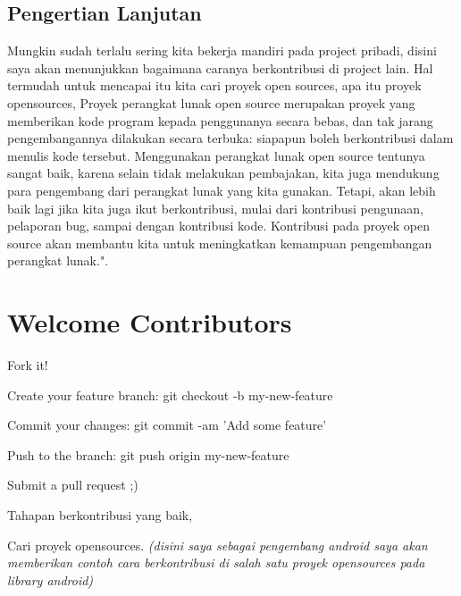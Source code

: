\subsection{Pengertian Lanjutan}

Mungkin sudah terlalu sering kita bekerja mandiri pada project pribadi, disini saya akan menunjukkan bagaimana caranya berkontribusi di project lain. Hal termudah untuk mencapai itu kita cari proyek open sources, apa itu proyek opensources, Proyek perangkat lunak open source merupakan proyek yang memberikan kode program kepada penggunanya secara bebas, dan tak jarang pengembangannya dilakukan secara terbuka: siapapun boleh berkontribusi dalam menulis kode tersebut. Menggunakan perangkat lunak open source tentunya sangat baik, karena selain tidak melakukan pembajakan, kita juga mendukung para pengembang dari perangkat lunak yang kita gunakan. Tetapi, akan lebih baik lagi jika kita juga ikut berkontribusi, mulai dari kontribusi pengunaan, pelaporan bug, sampai dengan kontribusi kode. Kontribusi pada proyek open source akan membantu kita untuk meningkatkan kemampuan pengembangan perangkat lunak.". \par
\vspace{12pt}
\vspace{12pt}
\noindent 
\section{Welcome Contributors} \par
Fork it! \par
Create your feature branch: git checkout -b my-new-feature \par
Commit your changes: git commit -am 'Add some feature' \par
Push to the branch: git push origin my-new-feature \par
Submit a pull request ;) \par
\noindent 
Tahapan berkontribusi yang baik, \par
\noindent 
Cari proyek opensources. \textit{(disini saya sebagai pengembang android saya akan memberikan contoh cara berkontribusi di salah satu proyek opensources pada library android)} \par
\noindent 
